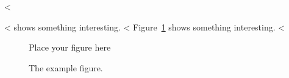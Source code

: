 <%

<%
 shows something interesting.
<%
Figure~\ref{fig:label} shows something interesting.
<%

\begin{LTXexample}
\begin{figure}
  \centering
  Place your figure here
  \caption{The example figure.}
  \label{fig:label}
\end{figure}
\end{LTXexample}
